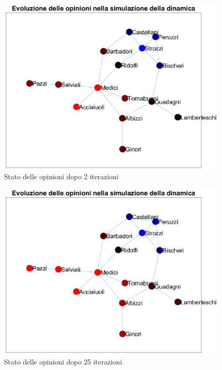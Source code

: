 \documentclass[11pt,largemargins]{homework}
\begin{document}
\begin{alphaparts}
  \begin{figure}
    \center
     \includegraphics[scale=0.6]{Grafo_2_iterazioni.eps}
    \caption{Stato delle opinioni dopo 2 iterazioni}
  \end{figure}
  \begin{figure}
    \center
    \includegraphics[scale=0.6]{Grafo_25_iter.eps}
    \caption{Stato delle opinioni dopo 25 iterazioni}
  \end{figure}
  \begin{figure}
    \center

\end{figure}
\end{alphaparts}
\end{document}

